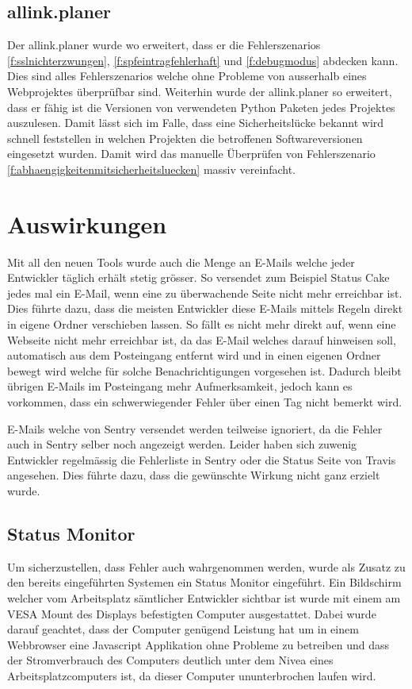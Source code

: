 \subsection{allink.planer}
\label{sub:proof_allink_planer}
Der allink.planer wurde wo erweitert, dass er die Fehlerszenarios \ref{f:sslnichterzwungen}, \ref{f:spfeintragfehlerhaft} und \ref{f:debugmodus} abdecken kann. Dies sind alles Fehlerszenarios welche ohne Probleme von ausserhalb eines Webprojektes überprüfbar sind. Weiterhin wurde der allink.planer so erweitert, dass er fähig ist die Versionen von verwendeten Python Paketen jedes Projektes auszulesen. Damit lässt sich im Falle, dass eine Sicherheitslücke bekannt wird schnell feststellen in welchen Projekten die betroffenen Softwareversionen eingesetzt wurden. Damit wird das manuelle Überprüfen von Fehlerszenario \ref{f:abhaengigkeitenmitsicherheitsluecken} massiv vereinfacht.

\section{Auswirkungen}
\label{sec:auswirkungen}
Mit all den neuen Tools wurde auch die Menge an E-Mails welche jeder Entwickler täglich erhält stetig grösser. So versendet zum Beispiel Status Cake jedes mal ein E-Mail, wenn eine zu überwachende Seite nicht mehr erreichbar ist. Dies führte dazu, dass die meisten Entwickler diese E-Mails mittels Regeln direkt in eigene Ordner verschieben lassen. So fällt es nicht mehr direkt auf, wenn eine Webseite nicht mehr erreichbar ist, da das E-Mail welches darauf hinweisen soll, automatisch aus dem Posteingang entfernt wird und in einen eigenen Ordner bewegt wird welche für solche Benachrichtigungen vorgesehen ist. Dadurch bleibt übrigen E-Mails im Posteingang mehr Aufmerksamkeit, jedoch kann es vorkommen, dass ein schwerwiegender Fehler über einen Tag nicht bemerkt wird.

E-Mails welche von Sentry versendet werden teilweise ignoriert, da die Fehler auch in Sentry selber noch angezeigt werden. Leider haben sich zuwenig Entwickler regelmässig die Fehlerliste in Sentry oder die Status Seite von Travis angesehen. Dies führte dazu, dass die gewünschte Wirkung nicht ganz erzielt wurde.

\subsection{Status Monitor}
\label{sub:status_monitor}
Um sicherzustellen, dass Fehler auch wahrgenommen werden, wurde als Zusatz zu den bereits eingeführten Systemen ein Status Monitor eingeführt. Ein Bildschirm welcher vom Arbeitsplatz sämtlicher Entwickler sichtbar ist wurde mit einem am VESA Mount des Displays befestigten Computer ausgestattet. Dabei wurde darauf geachtet, dass der Computer genügend Leistung hat um in einem Webbrowser eine Javascript Applikation ohne Probleme zu betreiben und dass der Stromverbrauch des Computers deutlich unter dem Nivea eines Arbeitsplatzcomputers ist, da dieser Computer ununterbrochen laufen wird.

